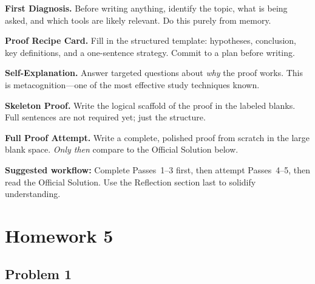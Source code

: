 \documentclass[12pt]{article}
\begin{document}
\medskip
\begin{description}[leftmargin=2.2cm, labelwidth=2.0cm, labelsep=0.2cm, itemsep=4pt]
  \item[\textsc{Pass 1}]
    \textbf{First Diagnosis.}
    Before writing anything, identify the topic, what is being asked, and which tools
    are likely relevant.  Do this purely from memory.

  \item[\textsc{Pass 2}]
    \textbf{Proof Recipe Card.}
    Fill in the structured template: hypotheses, conclusion, key definitions, and a
    one-sentence strategy.  Commit to a plan before writing.

  \item[\textsc{Pass 3}]
    \textbf{Self-Explanation.}
    Answer targeted questions about \emph{why} the proof works.  This is
    metacognition---one of the most effective study techniques known.

  \item[\textsc{Pass 4}]
    \textbf{Skeleton Proof.}
    Write the logical scaffold of the proof in the labeled blanks.
    Full sentences are not required yet; just the structure.

  \item[\textsc{Pass 5}]
    \textbf{Full Proof Attempt.}
    Write a complete, polished proof from scratch in the large blank space.
    \emph{Only then} compare to the Official Solution below.
\end{description}

\medskip
\textbf{Suggested workflow:} Complete Passes~1--3 first, then attempt Passes~4--5,
then read the Official Solution.  Use the Reflection section last to solidify understanding.

\newpage

\section{Homework 5}

\newpage
\subsection{Problem 1}
\end{document}
